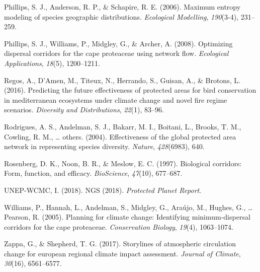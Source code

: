 \documentclass[]{article}
\begin{document}
\leavevmode\hypertarget{ref-phillips2006maximum}{}%
Phillips, S. J., Anderson, R. P., \& Schapire, R. E. (2006). Maximum entropy modeling of species geographic distributions. \emph{Ecological Modelling}, \emph{190}(3-4), 231--259.

\leavevmode\hypertarget{ref-phillips2008optimizing}{}%
Phillips, S. J., Williams, P., Midgley, G., \& Archer, A. (2008). Optimizing dispersal corridors for the cape proteaceae using network flow. \emph{Ecological Applications}, \emph{18}(5), 1200--1211.

\leavevmode\hypertarget{ref-regos2016predicting}{}%
Regos, A., D'Amen, M., Titeux, N., Herrando, S., Guisan, A., \& Brotons, L. (2016). Predicting the future effectiveness of protected areas for bird conservation in mediterranean ecosystems under climate change and novel fire regime scenarios. \emph{Diversity and Distributions}, \emph{22}(1), 83--96.

\leavevmode\hypertarget{ref-rodrigues2004effectiveness}{}%
Rodrigues, A. S., Andelman, S. J., Bakarr, M. I., Boitani, L., Brooks, T. M., Cowling, R. M., \ldots{} others. (2004). Effectiveness of the global protected area network in representing species diversity. \emph{Nature}, \emph{428}(6983), 640.

\leavevmode\hypertarget{ref-rosenberg1997biological}{}%
Rosenberg, D. K., Noon, B. R., \& Meslow, E. C. (1997). Biological corridors: Form, function, and efficacy. \emph{BioScience}, \emph{47}(10), 677--687.

\leavevmode\hypertarget{ref-unep2018ngs}{}%
UNEP-WCMC, I. (2018). NGS (2018). \emph{Protected Planet Report}.

\leavevmode\hypertarget{ref-williams2005planning}{}%
Williams, P., Hannah, L., Andelman, S., Midgley, G., Araújo, M., Hughes, G., \ldots{} Pearson, R. (2005). Planning for climate change: Identifying minimum-dispersal corridors for the cape proteaceae. \emph{Conservation Biology}, \emph{19}(4), 1063--1074.

\leavevmode\hypertarget{ref-zappa2017storylines}{}%
Zappa, G., \& Shepherd, T. G. (2017). Storylines of atmospheric circulation change for european regional climate impact assessment. \emph{Journal of Climate}, \emph{30}(16), 6561--6577.
\end{document}
